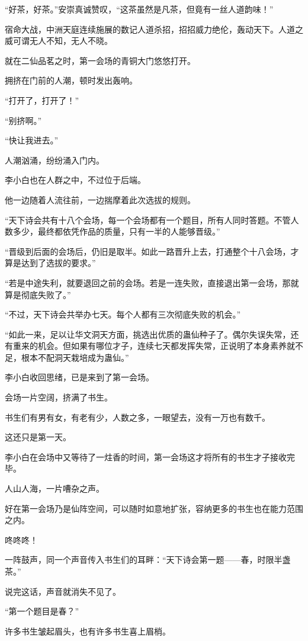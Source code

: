 \begin{this_body}
“好茶，好茶。”安崇真诚赞叹，“这茶虽然是凡茶，但竟有一丝人道韵味！”

宿命大战，中洲天庭连续施展的数记人道杀招，招招威力绝伦，轰动天下。人道之威可谓无人不知，无人不晓。

就在二仙品茗之时，第一会场的青铜大门悠悠打开。

拥挤在门前的人潮，顿时发出轰响。

“打开了，打开了！”

“别挤啊。”

“快让我进去。”

人潮汹涌，纷纷涌入门内。

李小白也在人群之中，不过位于后端。

他一边随着人流往前，一边揣摩着此次选拔的规则。

“天下诗会共有十八个会场，每一个会场都有一个题目，所有人同时答题。不管人数多少，最终都依凭作品的质量，只有一半的人能够晋级。”

“晋级到后面的会场后，仍旧是取半。如此一路晋升上去，打通整个十八会场，才算是达到了选拔的要求。”

“若是中途失利，就要退回之前的会场。若是一连失败，直接退出第一会场，那就算是彻底失败了。”

“不过，天下诗会共举办七天。每个人都有三次彻底失败的机会。”

“如此一来，足以让华文洞天方面，挑选出优质的蛊仙种子了。偶尔失误失常，还有重来的机会。但如果有哪位才子，连续七天都发挥失常，正说明了本身素养就不足，根本不配洞天栽培成为蛊仙。”

李小白收回思绪，已是来到了第一会场。

会场一片空阔，挤满了书生。

书生们有男有女，有老有少，人数之多，一眼望去，没有一万也有数千。

这还只是第一天。

李小白在会场中又等待了一炷香的时间，第一会场这才将所有的书生才子接收完毕。

人山人海，一片嘈杂之声。

好在第一会场乃是仙阵空间，可以随时如意地扩张，容纳更多的书生也在能力范围之内。

咚咚咚！

一阵鼓声，同一个声音传入书生们的耳畔：“天下诗会第一题——春，时限半盏茶。”

说完这话，声音就消失不见了。

“第一个题目是春？”

许多书生皱起眉头，也有许多书生喜上眉梢。


\end{this_body}
